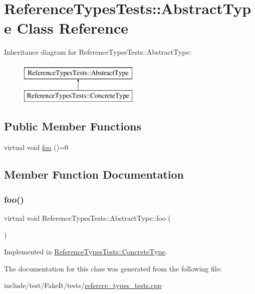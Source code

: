 \hypertarget{classReferenceTypesTests_1_1AbstractType}{}\section{Reference\+Types\+Tests\+::Abstract\+Type Class Reference}
\label{classReferenceTypesTests_1_1AbstractType}
Inheritance diagram for Reference\+Types\+Tests\+::Abstract\+Type\+:\begin{figure}[H]
\begin{center}
\leavevmode
\includegraphics[height=2.000000cm]{classReferenceTypesTests_1_1AbstractType}
\end{center}
\end{figure}
\subsection*{Public Member Functions}
\begin{DoxyCompactItemize}
\item 
virtual void \mbox{\hyperlink{classReferenceTypesTests_1_1AbstractType_a5688531c71ea9a2072d18413fb9ee356}{foo}} ()=0
\end{DoxyCompactItemize}


\subsection{Member Function Documentation}
\mbox{\label{classReferenceTypesTests_1_1AbstractType_a5688531c71ea9a2072d18413fb9ee356}} 
\subsubsection{\texorpdfstring{foo()}{foo()}}
{\footnotesize\ttfamily virtual void Reference\+Types\+Tests\+::\+Abstract\+Type\+::foo (\begin{DoxyParamCaption}{ }\end{DoxyParamCaption})\hspace{0.3cm}{\ttfamily [pure virtual]}}



Implemented in \mbox{\hyperlink{classReferenceTypesTests_1_1ConcreteType_aca90c05903e4ab0c480ae84c1ca75c2e}{Reference\+Types\+Tests\+::\+Concrete\+Type}}.



The documentation for this class was generated from the following file\+:\begin{DoxyCompactItemize}
\item 
include/test/\+Fake\+It/tests/\mbox{\hyperlink{referece__types__tests_8cpp}{referece\+\_\+types\+\_\+tests.\+cpp}}\end{DoxyCompactItemize}

